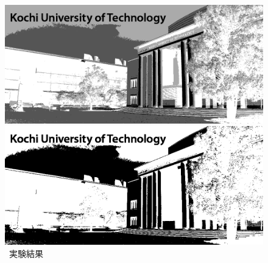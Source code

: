 \begin{figure}[H]
    \begin{minipage}[b]{.23\textwidth}
        \centering
        \includegraphics[keepaspectratio,width=\textwidth]{../../Figures/05_33_2.png}
    \end{minipage}
    \begin{minipage}[b]{.23\textwidth}
        \centering
        \includegraphics[keepaspectratio,width=\textwidth]{../../Figures/05_34_1.png}
    \end{minipage}
    \caption{\kadaiac\ 実験結果}
\end{figure}

